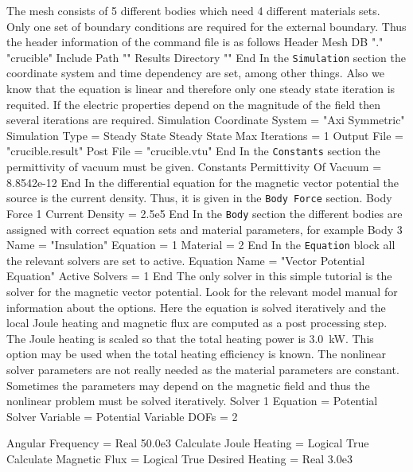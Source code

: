 The mesh consists of 5 different bodies which need 4
different materials sets. Only one set of boundary conditions 
are required for the external boundary. Thus the header 
information of the command file is as follows
\ttbegin
Header
  Mesh DB "." "crucible"
  Include Path ""
  Results Directory ""
End
\ttend
%
In the \texttt{Simulation} section the coordinate system and
time dependency are set, among other things. Also we know that
the equation is linear and therefore only one steady state
iteration is requited. If the electric properties depend on 
the magnitude of the field then several iterations are required.
\ttbegin
Simulation
  Coordinate System = "Axi Symmetric"
  Simulation Type = Steady State
  Steady State Max Iterations = 1
  Output File = "crucible.result"
  Post File = "crucible.vtu"
End
\ttend
%
In the \texttt{Constants} section the permittivity of 
vacuum must be given.
\ttbegin
Constants
  Permittivity Of Vacuum = 8.8542e-12
End
\ttend
%
In the differential equation for the magnetic vector potential the 
source is the current density. Thus, it is given in the
\texttt{Body Force} section. 
\ttbegin
Body Force 1
  Current Density = 2.5e5
End
\ttend
%
In the \texttt{Body} section the different bodies are assigned 
with correct equation sets and material parameters, for example
\ttbegin
Body 3
  Name = "Insulation"
  Equation = 1
  Material = 2
End
\ttend
%
In the \texttt{Equation} block all the relevant solvers are 
set to active.
\ttbegin
Equation
  Name = "Vector Potential Equation"
  Active Solvers = 1
End
\ttend
%
The only solver in this simple tutorial is the solver for the magnetic
vector potential. Look for the relevant model manual for information
about the options. Here the equation is solved iteratively and the
local Joule heating and magnetic flux are computed as a post processing
step. The Joule heating is scaled so that the total heating power is
3.0~kW. This option may be used when the total heating efficiency is
known.  The nonlinear solver parameters are not really needed as the
material parameters are constant. Sometimes the parameters may depend
on the magnetic field and thus the nonlinear problem must be solved
iteratively.
%
\ttbegin
Solver 1
  Equation = Potential Solver
  Variable = Potential
  Variable DOFs = 2

  Angular Frequency = Real 50.0e3
  Calculate Joule Heating = Logical True
  Calculate Magnetic Flux = Logical True
  Desired Heating = Real 3.0e3

